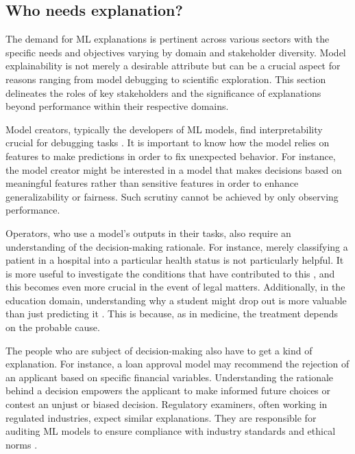 \subsection{Who needs explanation?}

The demand for \gls{ML} explanations is pertinent across various sectors with the specific needs and objectives varying by domain and stakeholder diversity. Model explainability is not merely a desirable attribute but can be a crucial aspect for reasons ranging from model debugging to scientific exploration. This section delineates the roles of key stakeholders and the significance of explanations beyond performance within their respective domains.

Model creators, typically the developers of ML models, find interpretability crucial for debugging tasks \cite{Bhatt2020ExplainableDeployment}. It is important to know how the model relies on features to make predictions in order to fix unexpected behavior. For instance, the model creator might be interested in a model that makes decisions based on meaningful features rather than sensitive features in order to enhance generalizability or fairness. Such scrutiny cannot be achieved by only observing performance.

Operators, who use a model's outputs in their tasks, also require an understanding of the decision-making rationale. For instance, merely classifying a patient in a hospital into a particular health status is not particularly helpful. It is more useful to investigate the conditions that have contributed to this \cite{Razavian2015Population-levelFactors}, and this becomes even more crucial in the event of legal matters. Additionally, in the education domain, understanding why a student might drop out is more valuable than just predicting it \cite{Pellagatti2021GeneralizedDropout,Berens2019EarlyMethods}. This is because, as in medicine, the treatment depends on the probable cause.

The people who are subject of decision-making also have to get a kind of explanation. For instance, a loan approval model may recommend the rejection of an applicant based on specific financial variables. Understanding the rationale behind a decision empowers the applicant to make informed future choices or contest an unjust or biased decision. Regulatory examiners, often working in regulated industries, expect similar explanations. They are responsible for auditing \gls{ML} models to ensure compliance with industry standards and ethical norms \cite{Chen2023Globally-ConsistentEvaluation, Flores2016FalseBlacks}. 

